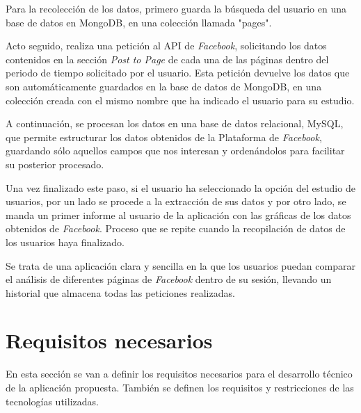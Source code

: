 Para la recolección de los datos, primero guarda la búsqueda del usuario en una base de datos en MongoDB, en una colección llamada "pages". 

Acto seguido, realiza una petición al API de \textit{Facebook}, solicitando los datos contenidos en la sección \textit{Post to Page} de cada una de las páginas dentro del periodo de tiempo solicitado por el usuario. Esta petición devuelve los datos que son automáticamente guardados en la base de datos de MongoDB, en una colección creada con el mismo nombre que ha indicado el usuario para su estudio. 

A continuación, se procesan los datos en una base de datos relacional, MySQL, que permite estructurar los datos obtenidos de la Plataforma de \textit{Facebook}, guardando sólo aquellos campos que nos interesan y ordenándolos para facilitar su posterior procesado.

Una vez finalizado este paso, si el usuario ha seleccionado la opción del estudio de usuarios, por un lado se procede a la extracción de sus datos y por otro lado, se manda un primer informe al usuario de la aplicación con las gráficas de los datos obtenidos de \textit{Facebook}. Proceso que se repite cuando la recopilación de datos de los usuarios haya finalizado.    

Se trata de una aplicación clara y sencilla en la que los usuarios puedan comparar el análisis de diferentes páginas de \textit{Facebook} dentro de su sesión, llevando un historial que almacena todas las peticiones realizadas. 

\section{Requisitos necesarios}
En esta sección se van a definir los requisitos necesarios para el desarrollo técnico de la aplicación propuesta. También se definen los requisitos y restricciones de las tecnologías utilizadas.

